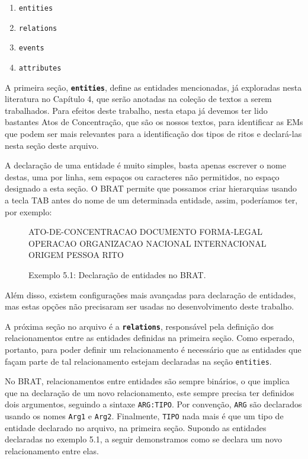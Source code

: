\documentclass[11pt]{report}
\begin{document}
\begin{enumerate}[label={\textbf{\arabic*.}}]
  \item \texttt{entities}
  \item \texttt{relations}
  \item \texttt{events}
  \item \texttt{attributes}
\end{enumerate}

A primeira seção, \textbf{\texttt{entities}}, define as entidades mencionadas, já exploradas nesta literatura no Capítulo 4, que serão anotadas na
coleção de textos a serem trabalhados. Para efeitos deste trabalho, nesta etapa já devemos ter lido bastantes Atos de Concentração, que são os nossos textos, para identificar as
EMs que podem ser mais relevantes para a identificação dos tipos de ritos e declará-las nesta seção deste arquivo.

A declaração de uma entidade é muito simples, basta apenas escrever o nome destas, uma por linha, sem espaços ou caracteres não permitidos, no espaço designado a esta seção. O BRAT
permite que possamos criar hierarquias usando a tecla TAB antes do nome de um determinada entidade, assim, poderíamos ter, por exemplo:

\begin{figure}[h!]
\centering
\begin{boxedverbatim}
[entities]

ATO-DE-CONCENTRACAO
DOCUMENTO
FORMA-LEGAL
OPERACAO
ORGANIZACAO
    NACIONAL
    INTERNACIONAL
ORIGEM
PESSOA
RITO
\end{boxedverbatim}
\caption*{Exemplo 5.1: Declaração de entidades no BRAT.}
\end{figure}

Além disso, existem configurações mais avançadas para declaração de entidades, mas estas opções não precisaram ser usadas no desenvolvimento deste trabalho.

A próxima seção no arquivo é a \textbf{\texttt{relations}}, responsável pela definição dos relacionamentos entre as entidades definidas na primeira seção. Como esperado, portanto,
para poder definir um relacionamento é necessário que as entidades que façam parte de tal relacionamento estejam declaradas na seção \texttt{entities}.

No BRAT, relacionamentos entre entidades são sempre binários, o que implica que na declaração de um novo relacionamento, este sempre precisa ter definidos dois argumentos,
seguindo a sintaxe \texttt{ARG:TIPO}. Por convenção, \texttt{ARG} são declarados usando os nomes \texttt{Arg1} e \texttt{Arg2}. Finalmente, \texttt{TIPO} nada mais é que
um tipo de entidade declarado no arquivo, na primeira seção. Supondo as entidades declaradas no exemplo 5.1, a seguir demonstramos como se declara um novo relacionamento entre elas.
\end{document}
